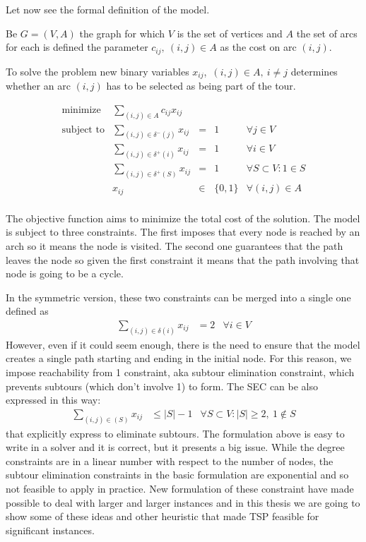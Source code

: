 Let now see the formal definition of the model. 

Be $G = (V, A)$ the graph for which $V$ is the set of vertices and $A$ the set
of arcs for each is defined the parameter $c_{ij},\ (i,j) \in A$ as the cost on
arc $(i,j)$.

To solve the problem new binary variables $x_{ij}$,\ $(i,j) \in A,\ i \neq j$
determines whether an arc $(i,j)$ has to be selected as being part of the tour.

\begin{equation*}
    \begin{array}{lrllr}
        \textrm{minimize}   & \displaystyle\sum_{(i, j) \in A} c_{ij}  x_{ij} \\
        \textrm{subject to} & \displaystyle\sum\limits_{(i, j) \in \delta^-(j)}  x_{ij} & = & 1 & \forall j \in V\\
                            & \displaystyle\sum\limits_{(i, j) \in \delta^+(i)}  x_{ij} & = & 1 & \forall i \in V\\
                            & \displaystyle\sum\limits_{(i, j) \in \delta^+(S)}  x_{ij} & = & 1 & \forall S \subset V : 1 \in S\\
                            & x_{ij} & \in & \{0,1\} & \forall (i,j) \in A \\
    \end{array}
\end{equation*}


The objective function aims to minimize the total cost of the solution. The
model is subject to three constraints. The first imposes that every node is
reached by an arch so it means the node is visited. The second one guarantees
that the path leaves the node so given the first constraint it means that the
path involving that node is going to be a cycle.

In the symmetric version, these two constraints can be merged into a single one
defined as
\begin{align*} 
    \sum_{(i,j) \in \delta(i)} x_{ij} & = 2 & \forall i\in V
\end{align*} 
However, even if it could seem enough, there is the need to ensure that the
model creates a single path starting and ending in the initial node. For this
reason, we impose reachability from 1 constraint, aka subtour elimination
constraint, which prevents subtours (which don't involve 1) to form. The SEC
can be also expressed in this way:
\begin{align*} 
    \sum_{(i,j) \in (S)} x_{ij} & \le |S|-1 & \forall S \subset V: |S| \ge 2,\ {1} \notin S 
\end{align*}
that explicitly express to eliminate subtours.
The formulation above is easy to write in a solver and it is correct, but it
presents a big issue. While the degree constraints are in a linear number with
respect to the number of nodes, the subtour elimination constraints in the
basic formulation are exponential and so not feasible to apply in practice. New
formulation of these constraint have made possible to deal with larger and
larger instances and in this thesis we are going to show some of these ideas
and other heuristic that made TSP feasible for significant instances.
